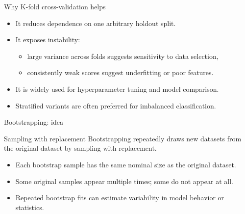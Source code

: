 \documentclass[12pt]{beamer}
\begin{document}
\begin{frame}{Why K-fold cross-validation helps}
  \begin{itemize}
    \item It reduces dependence on one arbitrary holdout split.
    \item It exposes instability:
      \begin{itemize}
        \item large variance across folds suggests sensitivity to data selection,
        \item consistently weak scores suggest underfitting or poor features.
      \end{itemize}
    \item It is widely used for hyperparameter tuning and model comparison.
    \item Stratified variants are often preferred for imbalanced classification.
  \end{itemize}
\end{frame}

\begin{frame}{Bootstrapping: idea}
  \begin{conceptbox}{Sampling with replacement}
    Bootstrapping repeatedly draws new datasets from the original dataset by sampling with replacement.
  \end{conceptbox}
  \begin{itemize}
    \item Each bootstrap sample has the same nominal size as the original dataset.
    \item Some original samples appear multiple times; some do not appear at all.
    \item Repeated bootstrap fits can estimate variability in model behavior or statistics.
  \end{itemize}
\end{frame}
\end{document}
